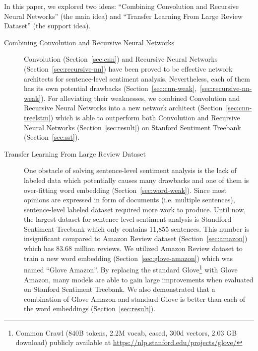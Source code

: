 In this paper, we explored two ideas: ``Combining Convolution and Recursive Neural Networks'' (the main idea) and ``Transfer Learning From Large Review Dataset'' (the support idea).
\begin{description}
	\item[Combining Convolution and Recursive Neural Networks] Convolution (Section~\ref{sec:cnn}) and Recursive Neural Networks (Section~\ref{sec:recursive-nn}) have been proved to be effective network architects for sentence-level sentiment analysis.
	Nevertheless, each of them has its own potential drawbacks (Section~\ref{sec:cnn-weak},~\ref{sec:recursive-nn-weak}).
	For alleviating their weaknesses, we combined Convolution and Recursive Neural Networks into a new network architect (Section~\ref{sec:cnn-treelstm}) which is able to outperform both Convolution and Recursive Neural Networks (Section~\ref{sec:result}) on Stanford Sentiment Treebank (Section~\ref{sec:sst}).
	\item[Transfer Learning From Large Review Dataset] One obstacle of solving sentence-level sentiment analysis is the lack of labeled data which potentially causes many drawbacks and one of them is over-fitting word embedding (Section~\ref{sec:word-weak}).
	Since most opinions are expressed in form of  documents (i.e. multiple sentences), sentence-level labeled dataset required more work to produce.
	Until now, the largest dataset for sentence-level sentiment analysis is Standford Sentiment Treebank which only contains 11,855 sentences.
	This number is insignificant compared to Amazon Review dataset (Section~\ref{sec:amazon}) which has 83.68 million reviews.
	We utilized Amazon Review dataset to train a new word embedding (Section~\ref{sec:glove-amazon}) which was named ``Glove Amazon''.
	By replacing the standard Glove\footnote{Common Crawl (840B tokens, 2.2M vocab, cased, 300d vectors, 2.03 GB download) publicly available at \url{https://nlp.stanford.edu/projects/glove/}} with Glove Amazon, many models are able to gain large improvements when evaluated on Stanford Sentiment Treebank.
	We also demonstrated that a combination of Glove Amazon and standard Glove is better than each of the word embeddings (Section~\ref{sec:result}).
\end{description}

